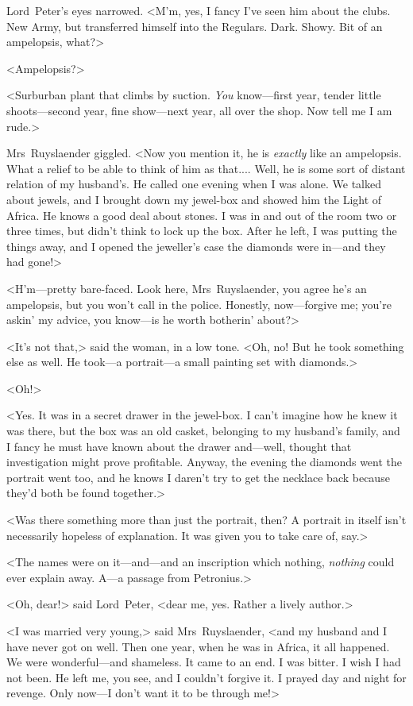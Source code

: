 Lord~Peter's eyes narrowed. <M'm, yes, I fancy I've seen him about the clubs. New Army, but transferred himself into the Regulars. Dark. Showy. Bit of an ampelopsis, what?>

<Ampelopsis?>

<Surburban plant that climbs by suction. \emph{You} know—first year, tender little shoots—second year, fine show—next year, all over the shop. Now tell me I am rude.>

Mrs~Ruyslaender giggled. <Now you mention it, he is \emph{exactly} like an ampelopsis. What a relief to be able to think of him as that.... Well, he is some sort of distant relation of my husband's. He called one evening when I was alone. We talked about jewels, and I brought down my jewel-box and showed him the Light of Africa. He knows a good deal about stones. I was in and out of the room two or three times, but didn't think to lock up the box. After he left, I was putting the things away, and I opened the jeweller's case the diamonds were in—and they had gone!>

<H'm—pretty bare-faced. Look here, Mrs~Ruyslaender, you agree he's an ampelopsis, but you won't call in the police. Honestly, now—forgive me; you're askin' my advice, you know—is he worth botherin' about?>

<It's not that,> said the woman, in a low tone. <Oh, no! But he took something else as well. He took—a portrait—a small painting set with diamonds.>

<Oh!>

<Yes. It was in a secret drawer in the jewel-box. I can't imagine how he knew it was there, but the box was an old casket, belonging to my husband's family, and I fancy he must have known about the drawer and—well, thought that investigation might prove profitable. Anyway, the evening the diamonds went the portrait went too, and he knows I daren't try to get the necklace back because they'd both be found together.>

<Was there something more than just the portrait, then? A portrait in itself isn't necessarily hopeless of explanation. It was given you to take care of, say.>

<The names were on it—and—and an inscription which nothing, \emph{nothing} could ever explain away. A—a passage from Petronius.>

<Oh, dear!> said Lord~Peter, <dear me, yes. Rather a lively author.>

<I was married very young,> said Mrs~Ruyslaender, <and my husband and I have never got on well. Then one year, when he was in Africa, it all happened. We were wonderful—and shameless. It came to an end. I was bitter. I wish I had not been. He left me, you see, and I couldn't forgive it. I prayed day and night for revenge. Only now—I don't want it to be through me!>

